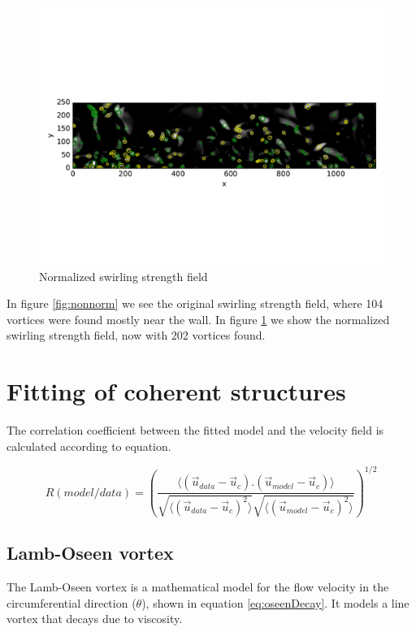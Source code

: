 \documentclass[12pt, a4paper, openany]{memoir}
\begin{document}
\begin{figure}[h]
	\centering
	\includegraphics[trim=0 130 0 130 , clip, width=\textwidth]{figure/PIVnormalized.pdf}
	\caption{Normalized swirling strength field}
	\label{fig:norm}
\end{figure}

In figure \ref{fig:nonnorm} we see the original swirling strength field, where 104 vortices were found mostly near the wall. In figure \ref{fig:norm} we show the normalized swirling strength field, now with 202 vortices found. 

\section{Fitting of coherent structures}

The correlation coefficient between the fitted model and the velocity field is calculated according to equation.

\begin{equation}
R(model/data) = \left( \frac{\langle (\vec{u}_{data}-\vec{u}_c).(\vec{u}_{model}-\vec{u}_c)\rangle }
{\sqrt{\langle (\vec{u}_{data}-\vec{u}_c)^2\rangle} \sqrt{\langle (\vec{u}_{model}-\vec{u}_c)^2\rangle}} \right)^{1/2}
\end{equation}

\subsection{Lamb-Oseen vortex}

The Lamb-Oseen vortex is a mathematical model for the flow velocity in the circumferential direction ($\theta$), shown in equation \ref{eq:oseenDecay}. It models a line vortex that decays due to viscosity.
\end{document}
